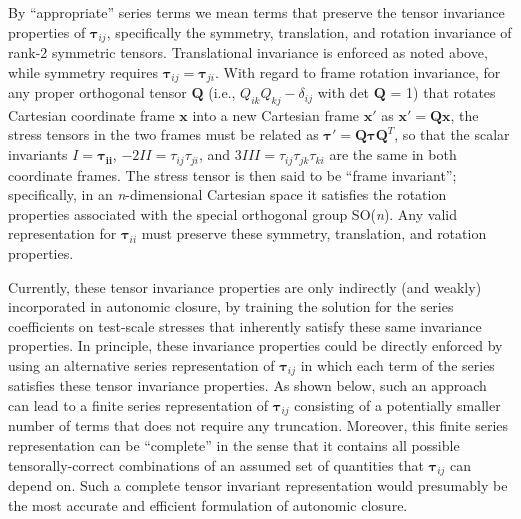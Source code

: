 By ``appropriate'' series terms we mean terms that preserve the tensor invariance properties of  $\mathbf{\tau}_{ij}$, specifically the symmetry, translation, and rotation invariance of rank-2 symmetric tensors.  Translational invariance is enforced as noted above, while symmetry requires  $\mathbf{\tau}_{ij} = \mathbf{\tau}_{ji}$.  With regard to frame rotation invariance, for any proper orthogonal tensor $\mathbf{Q}$ (i.e., $Q_{ik}Q_{kj} - \delta_{ij}$   with det $\mathbf{Q}$ = 1) that rotates Cartesian coordinate frame $\mathbf{x}$ into a new Cartesian frame $\mathbf{x'}$  as $\mathbf{x'} = \mathbf{Qx}$, the stress tensors in the two frames must be related as $\mathbf{\tau'} = \mathbf{Q\tau Q}^{T}$, so that the scalar invariants $I = \mathbf{\tau_{ii}}$, $-2II = \tau_{ij}\tau_{ji}$, and $3III = \tau_{ij}\tau_{jk}\tau_{ki}$  are the same in both coordinate frames.  The stress tensor is then said to be ``frame invariant''; specifically, in an \textit{n}-dimensional Cartesian space it satisfies the rotation properties associated with the special orthogonal group SO(\textit{n}).  Any valid representation for $\mathbf{\tau}_{ii}$  must preserve these symmetry, translation, and rotation properties.

Currently, these tensor invariance properties are only indirectly (and weakly) incorporated in autonomic closure, by training the solution for the series coefficients on test-scale stresses that inherently satisfy these same invariance properties. In principle, these invariance properties could be directly enforced by using an alternative series representation of $\mathbf{\tau}_{ij}$  in which each term of the series satisfies these tensor invariance properties. As shown below, such an approach can lead to a finite series representation of $\mathbf{\tau}_{ij}$  consisting of a potentially smaller number of terms that does not require any truncation. Moreover, this finite series representation can be “complete” in the sense that it contains all possible tensorally-correct combinations of an assumed set of quantities that $\mathbf{\tau}_{ij}$  can depend on. Such a complete tensor invariant representation would presumably be the most accurate and efficient formulation of autonomic closure.

